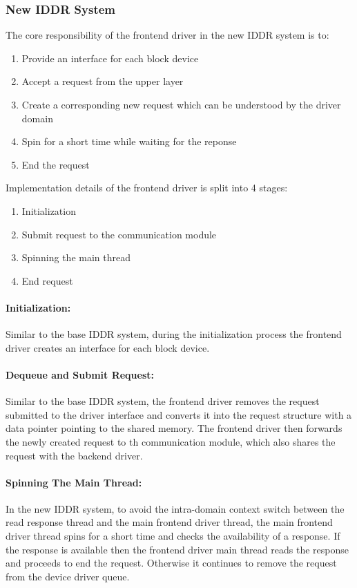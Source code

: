 \subsubsection*{New IDDR System}
The core responsibility of the frontend driver in the new IDDR system is to:
\begin{enumerate}
\item Provide an interface for each block device
\item Accept a request from the upper layer
\item Create a corresponding new request which can be understood by the driver domain
\item Spin for a short time while waiting for the reponse
\item End the request
\end{enumerate}

Implementation details of the frontend driver is split into 4 stages:
\begin{enumerate}
\item Initialization
\item Submit request to the communication module
\item Spinning the main thread
\item End request
\end{enumerate}

\paragraph{Initialization:}
Similar to the base IDDR system, during the initialization process the frontend driver creates an interface for each block device.

\paragraph{Dequeue and Submit Request:}
Similar to the base IDDR system, the frontend driver removes the request submitted to the driver interface and converts it into the request structure with a data pointer pointing to the shared memory. The frontend driver then forwards the newly created request to th communication module, which also shares the request with the backend driver.

\paragraph{Spinning The Main Thread:}
In the new IDDR system, to avoid the intra-domain context switch between the read response thread and the main frontend driver thread, the main frontend driver thread spins for a short time and checks the availability of a response. If the response is available then the frontend driver main thread reads the response and proceeds to end the request. Otherwise it continues to remove the request from the device driver queue.

